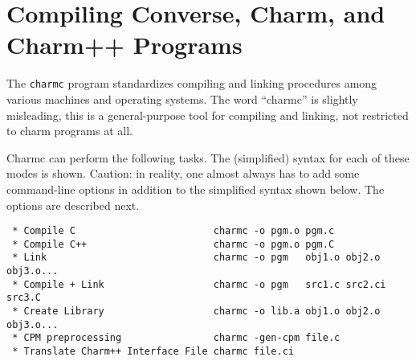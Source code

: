 %
%
%
%
%
%
%
%
%
%
%
%

\section{Compiling Converse, Charm, and Charm++ Programs}

The {\tt charmc} program standardizes compiling and linking procedures
among various machines and operating systems.  The word ``charmc'' is
slightly misleading, this is a general-purpose tool for compiling and
linking, not restricted to charm programs at all.

Charmc can perform the following tasks.  The (simplified) syntax for
each of these modes is shown.  Caution: in reality, one almost always
has to add some command-line options in addition to the simplified
syntax shown below.  The options are described next.

\begin{verbatim}
 * Compile C                        charmc -o pgm.o pgm.c
 * Compile C++                      charmc -o pgm.o pgm.C
 * Link                             charmc -o pgm   obj1.o obj2.o obj3.o...
 * Compile + Link                   charmc -o pgm   src1.c src2.ci src3.C
 * Create Library                   charmc -o lib.a obj1.o obj2.o obj3.o...
 * CPM preprocessing                charmc -gen-cpm file.c
 * Translate Charm++ Interface File charmc file.ci
\end{verbatim}

